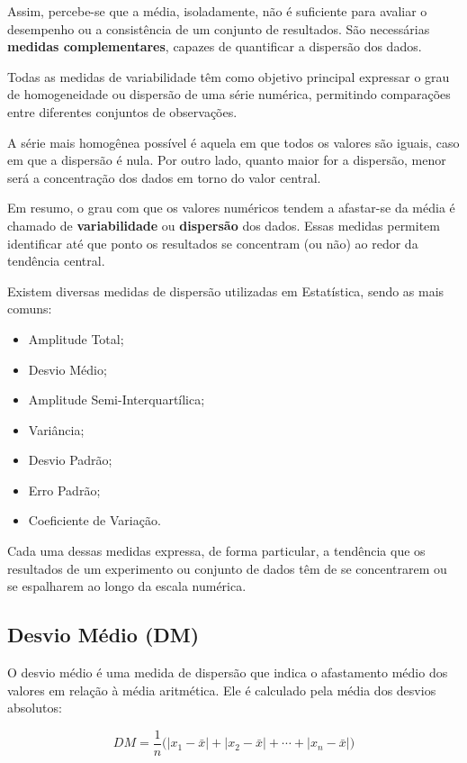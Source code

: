 Assim, percebe-se que a média, isoladamente, não é suficiente para avaliar o
desempenho ou a consistência de um conjunto de resultados. São necessárias
\textbf{medidas complementares}, capazes de quantificar a dispersão dos dados. \vskip0.3cm

Todas as medidas de variabilidade têm como objetivo principal expressar o grau
de homogeneidade ou dispersão de uma série numérica, permitindo comparações
entre diferentes conjuntos de observações. \vskip0.3cm

A série mais homogênea possível é aquela em que todos os valores são iguais,
caso em que a dispersão é nula. Por outro lado, quanto maior for a dispersão,
menor será a concentração dos dados em torno do valor central. \vskip0.3cm

Em resumo, o grau com que os valores numéricos tendem a afastar-se da média é
chamado de \textbf{variabilidade} ou \textbf{dispersão} dos dados. Essas medidas
permitem identificar até que ponto os resultados se concentram (ou não) ao redor
da tendência central. \vskip0.3cm

Existem diversas medidas de dispersão utilizadas em Estatística, sendo as mais
comuns:

\begin{itemize}
    \item Amplitude Total;
    \item Desvio Médio;
    \item Amplitude Semi-Interquartílica;
    \item Variância;
    \item Desvio Padrão;
    \item Erro Padrão;
    \item Coeficiente de Variação.
\end{itemize}

Cada uma dessas medidas expressa, de forma particular, a tendência que os
resultados de um experimento ou conjunto de dados têm de se concentrarem ou se
espalharem ao longo da escala numérica.



\subsection{Desvio Médio (DM)}

O desvio médio é uma medida de dispersão que indica o afastamento médio dos valores em relação à média aritmética. Ele é calculado pela média dos desvios absolutos:

\begin{equation}\label{eq:dm_final}
DM = \frac{1}{n}\Big(
|x_1-\bar{x}|+
|x_2-\bar{x}|+
\cdots+
|x_n-\bar{x}|
\Big)
\end{equation}


